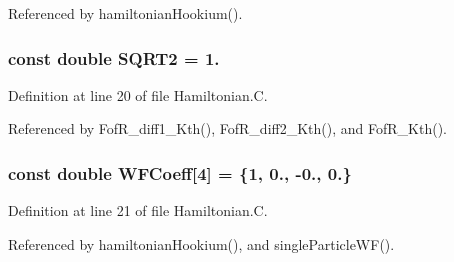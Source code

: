 Referenced by hamiltonian\-Hookium().

\hypertarget{_hamiltonian_8_c_a0dac55511b8235578f5364bcd618056f}{
\subsubsection[{S\-Q\-R\-T2}]{\setlength{\rightskip}{0pt plus 5cm}const double S\-Q\-R\-T2 = 1.}}\label{_hamiltonian_8_c_a0dac55511b8235578f5364bcd618056f}


Definition at line 20 of file Hamiltonian.\-C.



Referenced by Fof\-R\-\_\-diff1\-\_\-\-Kth(), Fof\-R\-\_\-diff2\-\_\-\-Kth(), and Fof\-R\-\_\-\-Kth().

\hypertarget{_hamiltonian_8_c_a9e3e25918df4dde4f87afaba7778d262}{
\subsubsection[{W\-F\-Coeff}]{\setlength{\rightskip}{0pt plus 5cm}const double W\-F\-Coeff\mbox{[}4\mbox{]} = \{1, 0., -\/0., 0.\}}}\label{_hamiltonian_8_c_a9e3e25918df4dde4f87afaba7778d262}


Definition at line 21 of file Hamiltonian.\-C.



Referenced by hamiltonian\-Hookium(), and single\-Particle\-W\-F().

